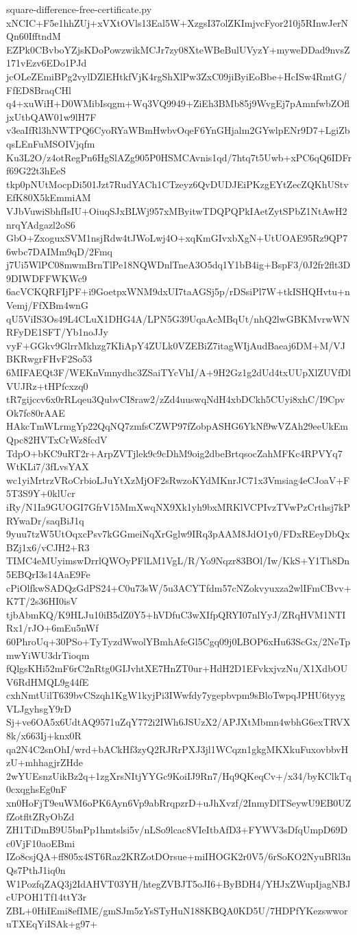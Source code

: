 \documentclass[11pt]{article}
\theoremstyle{definition}
\theoremstyle{remark}
\begin{document}
\begin{filecontents*}[overwrite]{square-difference-free-certificate.py}
xNCIC+F5e1hhZUj+xVXtOVls13Eal5W+XzgsI37olZKImjvcFyor210j5RInwJerNQn60IfftndM
EZPk0CBvboYZjsKDoPowzwikMCJr7zy08XteWBeBulUVyzY+myweDDad9nvsZ171vEzv6EDo1PJd
jcOLeZEmiBPg2vylDZlEHtkfVjK4rgShXlPw3ZxC09jiByiEoBbe+HcISw4RmtG/FfED8BraqCHl
q4+xuWiH+D0WMibIsqgm+Wq3VQ9949+ZiEh3BMb85j9WvgEj7pAmnfwbZOfljxUtbQAW01w9lH7F
v3eaIfRl3hNWTPQ6CyoRYaWBmHwbvOqeF6YnGHjalm2GYwlpENr9D7+LgiZbqsLEnFuMSOIVjqfm
Ku3L2O/z4otRegPn6HgSlAZg905P0HSMCAvnis1qd/7htq7t5Uwb+xPC6qQ6IDFrf69G22t3hEeS
tkp0pNUtMocpDi501Jzt7RudYACh1CTzeyz6QvDUDJEiPKzgEYtZecZQKhUStvEfK80X5kEmmiAM
VJbVuwiSbhfIsIU+OiuqSJxBLWj957xMByitwTDQPQPkIAetZytSPbZ1NtAwH2nrqYAdgazl2oS6
GbO+ZxoguxSVM1nsjRdw4tJWoLwj4O+xqKmGIvxbXgN+UtUOAE95Rz9QP76wbc7DAIMm9qD/2Fmq
j7Ui5WlPC08mwmBrnTlPe18NQWDnlTneA3O5dq1Y1bB4ig+BspF3/0J2fr2flt3D9DIWDFFWKWc9
6acVCKQRFIjPF+i9GoetpxWNM9dxUI7taAGSj5p/rDSsiPl7W+tkISHQHvtu+nVemj/FfXBm4wnG
qU5ViIS3Os49L4CLuX1DHG4A/LPN5G39UqaAcMBqUt/nhQ2lwGBKMvrwWNRFyDE1SFT/Yb1noJJy
vyF+GGkv9GlrrMkhzg7KIiApY4ZULk0VZEBiZ7itagWIjAudBaeaj6DM+M/VJBKRwgrFHvF2So53
6MIFAEQt3F/WEKnVmnydhc3ZSaiTYcVhI/A+9H2Gz1g2dUd4txUUpXlZUVfDlVUJRz+tHPfcxzq0
tR7gijccv6x0rRLqeu3QubvCI8raw2/zZd4uuswqNdH4xbDCkh5CUyi8xhC/I9CpvOk7fc80rAAE
HAkcTmWLrmgYp22QqNQ7zmfsCZWP97fZobpASHG6YkNf9wVZAh29eeUkEmQpc82HVTxCrWz8fcdV
TdpO+bKC9uRT2r+ArpZVTjlek9c9cDhM9oig2dbeBrtqsocZahMFKc4RPVYq7WtKLi7/3fLvsYAX
wc1yiMrtrzVRoCrbioLJuYtXzMjOF2sRwzoKYdMKnrJC71x3Vmsiag4eCJoaV+F5T3S9Y+0klUcr
iRy/N1Ia9GUOGI7GfrV15MmXwqNX9Xk1yh9bxMRKlVCPIvzTVwPzCrthsj7kPRYwaDr/saqBiJ1q
9yuu7tzW5UtOqxcPsv7kGGmeiNqXrGglw9IRq3pAAM8JdO1y0/FDxREeyDbQxBZj1x6/vCJH2+R3
TIMC4eMUyimswDrrlQWOyPFlLM1VgL/R/Yo9Nqzr83BOl/Iw/KkS+Y1Th8Dn5EBQrI3s14AaE9Fe
cPiOlfkwSADQzGdPS24+C0u73sW/5u3ACYTfdm57cNZokvyuxza2wlIFmCBvv+K7T/2s36HI0isV
tjbAbmKQ/K9HLJu10iB5dZ0Y5+hVDfuC3wXIfpQRYI07nlYyJ/ZRqHVM1NTIRx1/rJO+6mEu5nWf
60PhroUq+30PSo+TyTyzdWwolYBmhAfeGl5Cgq09j0LBOP6xHu63ScGx/2NeTpmwYiWU3drTioqm
fQlgsKHi52mF6rC2nRtg0GIJvhtXE7HnZT0ur+HdH2D1EFvkxjvzNu/X1XdbOUV6RdHMQL9g44fE
cxhNmtUilT639bvCSzqh1KgW1kyjPi3IWwfdy7ygepbvpm9sBloTwpqJPHU6tyygVLJgyhsgY9rD
Sj+ve6OA5x6UdtAQ9571uZqY772i2IWh6JSUzX2/APJXtMbmn4wbhG6exTRVX8k/x663Ij+knx0R
qa2N4C2snOhI/wrd+bACkHf3zyQ2RJRrPXJ3jl1WCqzn1gkgMKXkuFuxovbbvHzU+mhhagjrZHde
2wYUEsnzUikBz2q+1zgXrsNItjYYGc9KoiIJ9Rn7/Hq9QKeqCv+/x34/byKClkTq0cxqghsEg0nF
xn0HoFjT9euWM6oPK6Ayn6Vp9abRrqpzrD+uJhXvzf/2InmyDlTSeywU9EB0UZfZotfltZRyObZd
ZH1TiDmB9U5bnPp1hmtslsi5v/nLSo9lcac8VIeItbAfD3+FYWV3sDfqUmpD69Dc0VjF10aoEBmi
IZo8csjQA+ff805x4ST6Raz2KRZotDOrsue+miIHOGK2r0V5/6rSoKO2NyuBRl3nQs7PthJ1iq0n
W1PozfqZAQ3j2IdAHVT03YH/htegZVBJT5oJI6+ByBDH4/YHJxZWupIjagNBJcUPOH1Tf14ttY3r
ZBL+0HiIEmi8efIME/gmSJm5zYsSTyHuN188KBQA0KD5U/7HDPfYKezswworuTXEqYiISAk+g97+

\end{filecontents*}
\end{document}

